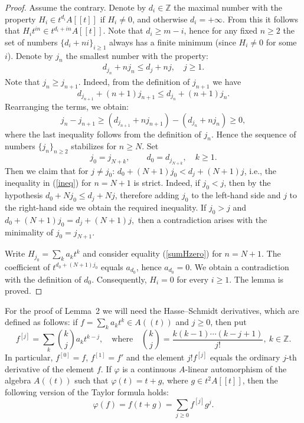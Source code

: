 \documentclass[11pt,a4paper]{article}
\theoremstyle{plain}
\newcommand{\Z}{\mathbb{Z}}
\begin{document}
\begin{proof}
Assume the contrary. Denote by $d_{i}\in \Z$ the maximal number with the property $H_{i} \in t^{d_{i}}A[[t]]$ if $H_{i}\neq 0$, and otherwise $d_{i}= +\infty$. From this it follows that $H_{i}t^{in}\in t^{d_{i}+in}A[[t]]$. Note that $d_{i}\geq m-i$, hence for any fixed $n\geq 2$ the set of numbers $\{d_{i}+ni\}_{i\geq 1}$ always has a finite minimum (since $H_{i}\neq 0$ for some $i$).
  Denote by $j_{n}$ the smallest number with the property:
\begin{align}\label{ineq}
d_{j_n} + n j_{n} \leq d_{j} + nj, \quad j\geq 1.
\end{align}
Note that $j_{n} \geq j_{n+1}$. Indeed, from the definition of $j_{n+1}$ we have
$$ d_{j_{n+1}} + (n+1) j_{n+1} \leq d_{j_{n}} + (n+1)j_{n}.$$
Rearranging the terms, we obtain:
$$j_{n} - j_{n+1} \geq (d_{j_{n+1}} + nj_{n+1}) - (d_{j_{n}} + nj_{n}) \geq 0,$$
where the last inequality follows from the definition of $j_{n}$. Hence the sequence of numbers $\{j_{n}\}_{n\geq 2}$ stabilizes for $n\geq N$.
Set
$$j_0 = j_{N+k}, \qquad d_{0} = d_{j_{N+k}}, \quad k\geq 1.$$
Then we claim that for $j \neq j_0$: $d_{0} + (N+1)j_{0} < d_{j} + (N+1)j$, i.e., the inequality in (\ref{ineq}) for $n = N+1$ is strict. Indeed, if $j_{0} < j$, then by the hypothesis $d_{0} + N j_{0} \leq d_{j} + Nj$, therefore adding $j_{0}$ to the left-hand side and $j$ to the right-hand side we obtain the required inequality. If $j_{0} > j$ and
$ d_{0} + (N+1) j_{0} = d_{j} + (N+1)j,$
then a contradiction arises with the minimality of $j_{0} = j_{N+1}$.

Write $H_{j_{0}} = \sum_{k} a_{k}t^{k}$ and consider equality (\ref{sumHzero}) for $n = N+1$. The coefficient of $t^{d_{0}+(N+1)j_{0}}$ equals $a_{d_{0}}$, hence $a_{d_0} = 0$. We obtain a contradiction with the definition of $d_{0}$. Consequently, $H_{i}=0$ for every $i\geq 1$. The lemma is proved.
\end{proof}

For the proof of Lemma~2 we will need the Hasse–Schmidt derivatives, which are defined as follows: if $f = \sum_{k} a_{k}t^{k}\in A((t))$ and $j \geq  0$, then put
$$f^{[j]} = \sum_{k} \binom{k}{j} a_{k}t^{k-j}, \quad \text{where}\quad \binom{k}{j} = \frac{k(k-1)\cdots (k-j+1)}{j!},\ k\in \mathbb{Z}.$$
In particular, $f^{[0]} = f$, $f^{[1]} = f'$ and the element $j! f^{[j]}$ equals the ordinary $j$-th derivative of the element $f$. If $\varphi$ is a continuous $A$-linear automorphism of the algebra $A((t))$ such that $\varphi(t) = t + g$, where $g\in t^{2}A[[t]]$, then the following version of the Taylor formula holds:
\begin{equation}\label{taylor}
\varphi(f) = f(t+g) = \sum_{j\geq 0} f^{[j]}g^{j}.
\end{equation}
\end{document}
